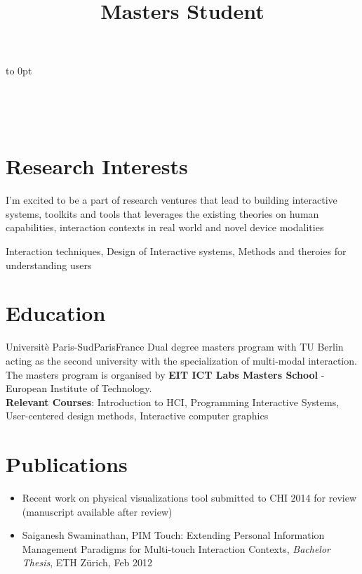 \documentclass[11pt,a4paper,sans]{moderncv}   %
\title{Masters Student}                          %
\makeatletter
\renewcommand*{\makecvtitle}{%
  \recomputecvlengths%
  \newbox{\makecvtitledetailsbox}%
  \savebox{\makecvtitledetailsbox}{%
    \addressfont\color{color2}%
    \begin{tabular}[t]{@{}r@{}}%
      \ifthenelse{\isundefined{\@addressstreet}}{}{\makenewline\addresssymbol\@addressstreet%
        \ifthenelse{\equal{\@addresscity}{}}{}{\makenewline\@addresscity}}%
      \ifthenelse{\isundefined{\@mobile}}{}{\makenewline\mobilesymbol\@mobile}%
      \ifthenelse{\isundefined{\@email}}{}{\makenewline\emailsymbol\emaillink{\@email}}%
      \ifthenelse{\isundefined{\@homepage}}{}{\makenewline\homepagesymbol\httplink{\@homepage}}%
      \ifthenelse{\isundefined{\@extrainfo}}{}{\makenewline\@extrainfo}%
    \end{tabular}
  }%
  \newbox{\makecvtitlepicturebox}%
  \savebox{\makecvtitlepicturebox}{%
    \ifthenelse{\isundefined{\@photo}}%
    {}%
    {%
      \hspace*{\separatorcolumnwidth}%
      \color{color1}%
      \setlength{\fboxrule}{\@photoframewidth}%
      \ifdim\@photoframewidth=0pt%
        \setlength{\fboxsep}{0pt}\fi%
  \framebox{\texttt{[image: \\@photo]}}}}%
  \newlength{\makecvtitledetailswidth}\settowidth{\makecvtitledetailswidth}{\usebox{\makecvtitledetailsbox}}%
  \newlength{\makecvtitlepicturewidth}\settowidth{\makecvtitlepicturewidth}{\usebox{\makecvtitlepicturebox}}%
  \ifthenelse{\lengthtest{\makecvtitlenamewidth=0pt}}%
    {\setlength{\makecvtitlenamewidth}{\textwidth-\makecvtitledetailswidth-\makecvtitlepicturewidth}}%
    {}%
  \begin{minipage}[t]{\makecvtitlenamewidth}%
    \namestyle{\@firstname\ \@familyname}%
    \ifthenelse{\equal{\@title}{}}{}{\\[1.25em]\titlestyle{\@title}}%
  \end{minipage}%
  \hfill%
  \llap{%
    \begin{minipage}[t]{\makecvtitledetailswidth}%
    \vspace*{-17pt}%
    \usebox{\makecvtitledetailsbox}%
    \end{minipage}}%
  \begin{minipage}[t]{\makecvtitlepicturewidth}%
    \vspace*{-17pt}%
    \vbox to 0pt{%
      \usebox{\makecvtitlepicturebox}%
    }%
  \end{minipage}\\[2.5em]%
  \ifthenelse{\isundefined{\@quote}}%
    {}%
    {{\centering\begin{minipage}{\quotewidth}\centering\quotestyle{\@quote}\end{minipage}\\[2.5em]}}%
  \par}%
\makeatother
\begin{document}
\makecvtitle



\section{Research Interests}

 {I'm excited to be a part of research ventures that lead to building interactive systems, toolkits and tools that leverages the existing theories on human capabilities, interaction contexts in real world and novel device modalities} 

 {Interaction techniques, Design of Interactive systems, Methods and theroies for understanding users} 


\section{Education}

 {Universit\`e Paris-Sud}{Paris}{France}{ Dual degree masters program with TU Berlin acting as the second university with the specialization of multi-modal interaction. The masters program is organised by {\textbf{\textsf{EIT ICT Labs Masters School}}} - European Institute of Technology.\\ 
\textbf{\textsf{Relevant Courses}}: Introduction to HCI, Programming Interactive Systems, User-centered design methods, Interactive computer graphics}
\medskip
{}
\medskip  %

\section{Publications}
\begin{itemize}
  \item  Recent work on physical visualizations tool submitted to CHI 2014 for review (manuscript available after review)
  
  \item Saiganesh Swaminathan, PIM Touch: Extending Personal Information Management Paradigms for Multi-touch Interaction Contexts, \emph{Bachelor Thesis}, ETH Z\"urich, Feb 2012 
  
   
\end{itemize}  
\end{document}
